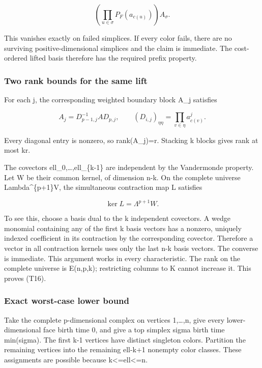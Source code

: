 \[
\left(\prod_{u\in\sigma}P_F(a_{c(u)})\right)A_\sigma.
 \tag{T18}
\]

This vanishes exactly on failed simplices. If every color fails, there are no surviving positive-dimensional simplices and the claim is immediate. The cost-ordered lifted basis therefore has the required prefix property.

\hypertarget{af-3f6acd6e5b-two-rank-bounds-for-the-same-lift}{%
\subsubsection{Two rank bounds for the same lift}\label{af-3f6acd6e5b-two-rank-bounds-for-the-same-lift}}

For each j, the corresponding weighted boundary block A\_j satisfies

\[
A_j=D_{p-1,j}^{-1} A D_{p,j},\qquad
 (D_{i,j})_{\eta\eta}=\prod_{v\in\eta}a_{c(v)}^j.
 \tag{T19}
\]

Every diagonal entry is nonzero, so rank(A\_j)=r. Stacking k blocks gives rank at most kr.

The covectors ell\_0,\ldots,ell\_\{k-1\} are independent by the Vandermonde property. Let W be their common kernel, of dimension n-k. On the complete universe Lambda\^{}\{p+1\}V, the simultaneous contraction map L satisfies

\[
\ker L=\Lambda^{p+1}W.
 \tag{T20}
\]

To see this, choose a basis dual to the k independent covectors. A wedge monomial containing any of the first k basis vectors has a nonzero, uniquely indexed coefficient in its contraction by the corresponding covector. Therefore a vector in all contraction kernels uses only the last n-k basis vectors. The converse is immediate. This argument works in every characteristic. The rank on the complete universe is E(n,p,k); restricting columns to K cannot increase it. This proves (T16).

\hypertarget{af-3f6acd6e5b-exact-worst-case-lower-bound}{%
\subsubsection{Exact worst-case lower bound}\label{af-3f6acd6e5b-exact-worst-case-lower-bound}}

Take the complete p-dimensional complex on vertices 1,\ldots,n, give every lower-dimensional face birth time 0, and give a top simplex sigma birth time min(sigma). The first k-1 vertices have distinct singleton colors. Partition the remaining vertices into the remaining ell-k+1 nonempty color classes. These assignments are possible because k\textless=ell\textless=n.

